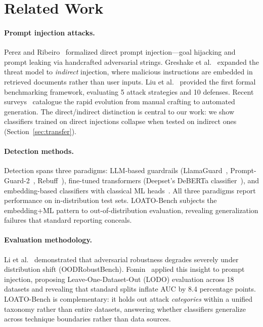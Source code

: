 \documentclass[conference]{IEEEtran}
\begin{document}
\section{Related Work}
\label{sec:related}

\paragraph{Prompt injection attacks.}
Perez and Ribeiro~\cite{perez2022ignore} formalized direct prompt
injection---goal hijacking and prompt leaking via handcrafted adversarial
strings. Greshake et al.~\cite{greshake2023not} expanded the threat model
to \emph{indirect} injection, where malicious instructions are embedded in
retrieved documents rather than user inputs. Liu et
al.~\cite{liu2024formalizing} provided the first formal benchmarking
framework, evaluating 5 attack strategies and 10 defenses. Recent
surveys~\cite{esmradi2025comprehensive} catalogue the rapid evolution from
manual crafting to automated generation. The direct/indirect distinction is
central to our work: we show classifiers trained on direct injections collapse
when tested on indirect ones (Section~\ref{sec:transfer}).

\paragraph{Detection methods.}
Detection spans three paradigms: LLM-based guardrails
(LlamaGuard~\cite{inan2023llamaguard},
Prompt-Guard-2~\cite{meta2024promptguard},
Rebuff~\cite{protectai2023rebuff}), fine-tuned transformers
(Deepset's DeBERTa classifier~\cite{deepset2023promptinjections}), and
embedding-based classifiers with classical ML
heads~\cite{ayub2024embedding}. All three paradigms report performance on
in-distribution test sets. LOATO-Bench subjects the embedding+ML pattern to
out-of-distribution evaluation, revealing generalization failures that standard
reporting conceals.

\paragraph{Evaluation methodology.}
Li et al.~\cite{li2024oodrobustbench} demonstrated that adversarial
robustness degrades severely under distribution shift (OODRobustBench).
Fomin~\cite{fomin2026benchmarks} applied this insight to prompt
injection, proposing Leave-One-Dataset-Out (LODO) evaluation across 18 datasets
and revealing that standard splits inflate AUC by 8.4 percentage points.
LOATO-Bench is complementary: it holds out attack \emph{categories} within a
unified taxonomy rather than entire datasets, answering whether classifiers
generalize across technique boundaries rather than data sources.
\end{document}

